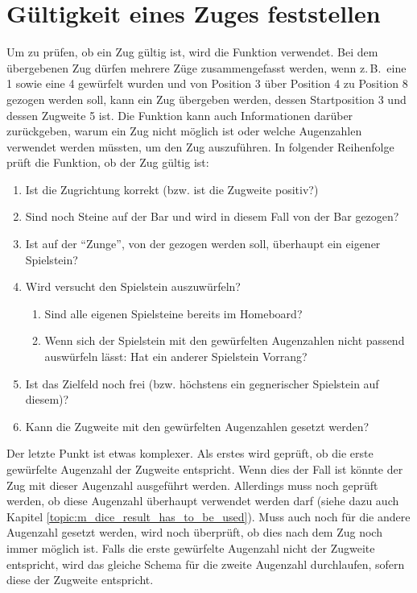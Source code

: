 \section{Gültigkeit eines Zuges feststellen}
Um zu prüfen, ob ein Zug gültig ist, wird die Funktion  verwendet. Bei dem übergebenen Zug dürfen mehrere Züge zusammengefasst werden, wenn z.\,B.~eine 1 sowie eine 4 gewürfelt wurden und von Position 3 über Position 4 zu Position 8 gezogen werden soll, kann ein Zug übergeben werden, dessen Startposition 3 und dessen Zugweite 5 ist. Die Funktion kann auch Informationen darüber zurückgeben, warum ein Zug nicht möglich ist oder welche Augenzahlen verwendet werden müssten, um den Zug auszuführen. In folgender Reihenfolge prüft die Funktion, ob der Zug gültig ist:
\begin{enumerate}
  \item Ist die Zugrichtung korrekt (bzw. ist die Zugweite positiv?)
  \item Sind noch Steine auf der Bar und wird in diesem Fall von der Bar gezogen?
  \item Ist auf der "`Zunge"', von der gezogen werden soll, überhaupt ein eigener Spielstein?
  \item Wird versucht den Spielstein auszuwürfeln?
    \begin{enumerate}[\theenumi.1.]
      \item Sind alle eigenen Spielsteine bereits im Homeboard?
      \item Wenn sich der Spielstein mit den gewürfelten Augenzahlen nicht passend auswürfeln lässt: Hat ein anderer Spielstein Vorrang?
    \end{enumerate}
  \item Ist das Zielfeld noch frei (bzw. höchstens ein gegnerischer Spielstein auf diesem)?
  \item Kann die Zugweite mit den gewürfelten Augenzahlen gesetzt werden?
\end{enumerate}

Der letzte Punkt ist etwas komplexer. Als erstes wird geprüft, ob die erste gewürfelte Augenzahl der Zugweite entspricht. Wenn dies der Fall ist könnte der Zug mit dieser Augenzahl ausgeführt werden. Allerdings muss noch geprüft werden, ob diese Augenzahl überhaupt verwendet werden darf (siehe dazu auch Kapitel \ref{topic:m_dice_result_has_to_be_used}). Muss auch noch für die andere Augenzahl gesetzt werden, wird noch überprüft, ob dies nach dem Zug noch immer möglich ist. Falls die erste gewürfelte Augenzahl nicht der Zugweite entspricht, wird das gleiche Schema für die zweite Augenzahl durchlaufen, sofern diese der Zugweite entspricht.

